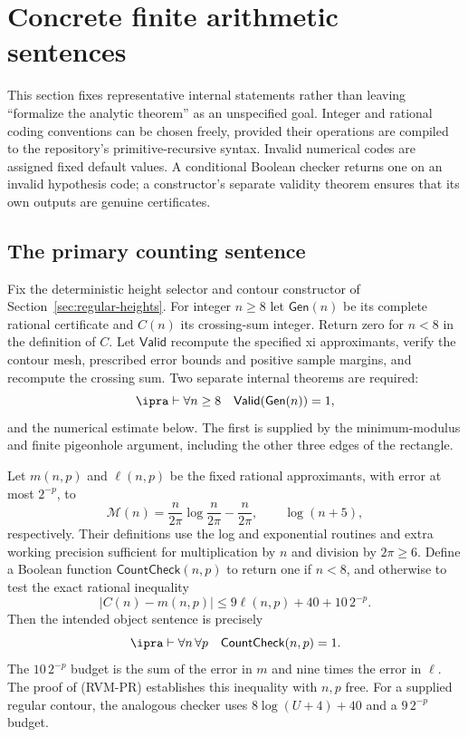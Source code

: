\section{Concrete finite arithmetic sentences}
\label{sec:contracts}

This section fixes representative internal statements rather than leaving
``formalize the analytic theorem'' as an unspecified goal. Integer and
rational coding conventions can be chosen freely, provided their
operations are compiled to the repository's primitive-recursive syntax.
Invalid numerical codes are assigned fixed default values. A conditional
Boolean checker returns one on an invalid hypothesis code; a constructor's
separate validity theorem ensures that its own outputs are genuine
certificates.

\subsection{The primary counting sentence}
Fix the deterministic height selector and contour constructor of
Section~\ref{sec:regular-heights}. For integer $n\ge8$ let
$\mathsf{Gen}(n)$ be its complete rational certificate and
$C(n)$ its crossing-sum integer. Return zero for $n<8$ in the
definition of $C$. Let $\mathsf{Valid}$ recompute the specified xi
approximants, verify the contour mesh, prescribed error bounds and
positive sample margins, and recompute the crossing sum. Two separate
internal theorems are required:
\begin{equation}
 \ipra\vdash\forall n\ge8\quad
            \mathsf{Valid}(\mathsf{Gen}(n))=1,
 \label{eq:generator-sentence}
\end{equation}
and the numerical estimate below. The first is supplied by the
minimum-modulus and finite pigeonhole argument, including the other
three edges of the rectangle.

Let $m(n,p)$ and $\ell(n,p)$ be the fixed rational approximants, with
error at most $2^{-p}$, to
\[
 \mathcal M(n)=\frac{n}{2\pi}\log\frac{n}{2\pi}-\frac{n}{2\pi},
 \qquad \log(n+5),
\]
respectively. Their definitions use the log and exponential routines
and extra working precision sufficient for multiplication by $n$ and
division by $2\pi\ge6$. Define a Boolean function
$\mathsf{CountCheck}(n,p)$ to return one if $n<8$, and otherwise to
test the exact rational inequality
\begin{equation}
 |C(n)-m(n,p)|\le9\ell(n,p)+40+10\,2^{-p}.
 \label{eq:count-matrix}
\end{equation}
Then the intended object sentence is precisely
\begin{equation}
       \ipra\vdash\forall n\,\forall p\quad
                   \mathsf{CountCheck}(n,p)=1.
 \label{eq:count-sentence}
\end{equation}
The $10\,2^{-p}$ budget is the sum of the error in $m$ and nine
times the error in $\ell$. The proof of (RVM-PR) establishes this
inequality with $n,p$ free. For a supplied regular contour, the analogous
checker uses $8\log(U+4)+40$ and a $9\,2^{-p}$ budget.

